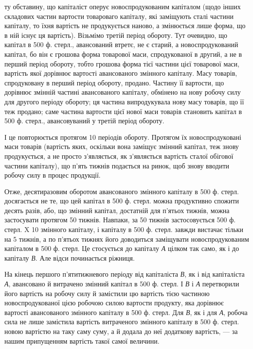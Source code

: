 \parcont{}  %
ту обставину, що капіталіст оперує новоспродукованим капіталом (щодо
інших складових частин вартости товароваго капіталу, які заміщують
сталі частини капіталу, то їхня вартість не продукується наново, а змінюється
лише форма, що в ній існує ця вартість). Візьмімо третій період
обороту. Тут очевидно, що капітал в 500 ф. стерл., авансований втретє,
не є старий, а новоспродукований капітал, бо він є грошова форма
товарової маси, спродукованої в другий, а не в перший період обороту,
тобто грошова форма тієї частини цієї товарової маси, вартість якої
дорівнює вартості авансованого змінного капіталу. Масу товарів, спродуковану
в перший період обороту, продано. Частину її вартости, що дорівнює
змінній частині авансованого капіталу, обмінено на нову робочу
силу для другого періоду обороту; ця частина випродукувала нову масу
товарів, що її теж продано; саме частина вартости цієї нової маси
товарів становить капітал в 500 ф. стерл., авансовуваний у третій період
обороту.

І це повторюється протягом 10 періодів обороту. Протягом їх новоспродуковані
маси товарів (вартість яких, оскільки вона заміщує змінний
капітал, теж знову продукується, а не просто з’являється, як з’являється
вартість сталої обігової частини капіталу), що п’ять тижнів подається
на ринок, щоб знову вводити робочу силу в процес продукції.

Отже, десятиразовим оборотом авансованого змінного капіталу в 500 ф.
стерл. досягається не те, що цей капітал в 500 ф. стерл. можна продуктивно
спожити десять разів, або, що змінний капітал, достатній для
п’ятьох тижнів, можна застосувати протягом 50 тижнів. Навпаки, за 50
тижнів застосовується 500 ф. стерл. X 10 змінного капіталу, і капіталу в
500 ф. стерл. завжди вистачає тільки на 5 тижнів, а по п’ятьох тижнях
його доводиться заміщувати новоспродукованим капіталом в 500 ф. стерл.
Це стосується до капіталу \emph{А} цілком так само, як і до капіталу \emph{В}. Але
відси починається ріжниця.

На кінець першого п’ятитижневого періоду від капіталіста \emph{В}, як і
від капіталіста \emph{А}, авансовано й витрачено змінний капітал в 500 ф. стерл.
І \emph{В} і \emph{А} перетворили його вартість на робочу силу й замістили цю вартість
тією частиною новоспродукованої цією робочою силою вартости продукту,
яка дорівнює вартості авансованого змінного капіталу в 500 ф. стерл. Для
\emph{В}, як і для \emph{А}, робоча сила не лише замістила вартість витраченого змінного
капіталу в 500 ф. стерл. новою вартістю на таку саму суму, а й додала
до неї додаткову вартість, — за нашим припущенням вартість такої
самої величини.

